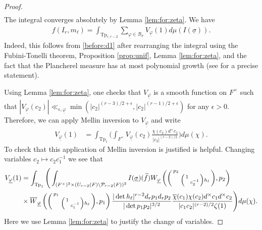 \documentclass[12pt]{amsart}
\theoremstyle{remark}
\numberwithin{equation}{section}
\theoremstyle{definition}
\newenvironment{psmatrix}
  {\left(\begin{smallmatrix}}
  {\end{smallmatrix}\right)}
\numberwithin{equation}{subsection}
\begin{document}
\begin{proof}
\begin{align*}
\end{align*}
The integral converges absolutely by Lemma \ref{lem:for:zeta}.
We have
\begin{align} \label{inV}
f(I_r,m_\ell)=\int_{\mathrm{Tp}_{r,r-2}} \sum_{\underline{\varphi}\in \mathcal{B}_{\underline{\sigma}}} V_{\underline{\varphi}}(1) d\mu(I(\underline{\sigma})).
\end{align}
Indeed, this follows from \eqref{before:d1} after rearranging the integral using the Fubini-Tonelli theorem, 
 Proposition \ref{prop:unif}, Lemma \ref{lem:for:zeta}, 
and the fact that the Plancherel measure has at most polynomial growth (see \cite[(2.13.2)]{BP:GLn} for a precise statement).

 Using Lemma \ref{lem:for:zeta}, one checks that $V_{\underline{\varphi}}$ is a smooth function on $F^\times$ such that  $|V_{\underline{\varphi}}(c_2)|\ll_{\epsilon,\underline{\varphi}} \min(|c_2|^{(r-3)/2+\epsilon},|c_2|^{(r-1)/2+\epsilon})$ for any $\epsilon>0$. Therefore, we can apply Mellin inversion to $V_{\underline{\varphi}}$ and write
\begin{align*}
    V_{\underline{\varphi}}(1)&=\int_{\mathrm{Tp}_1}\Big(\int_{F^\times} V_{\underline{\varphi}}(c_2)\frac{\chi(c_2)d^\times c_2}{|c_2|^{(r-2)/2}}\Big)d\mu(\chi).
\end{align*}
To check that this application of Mellin inversion is justified  \cite[(2.2)]{Blomer_Brumley_Ramanujan_Annals} is helpful.  
Changing variables $c_2 \mapsto c_2c_1^{-1}$ we see that 
\begin{align*}
V_{\underline{\varphi}}(1)&=
\int_{\mathrm{Tp}_1}\Bigg(\int_{(F^\times)^2 \times (U_{r-2}(F) \backslash \mathcal{P}_{r-2}(F))^2}I(\underline{\sigma})(\widetilde{f})W_{\underline{\varphi}}\left(\begin{psmatrix} p_2 & \\ & \begin{psmatrix} 1 & \\ & c_2^{-1}\end{psmatrix}h_\ell\end{psmatrix},p_2\right)\\& \times 
\overline{W}_{\underline{\varphi}}\left(\begin{psmatrix} p_1 & \\ & \begin{psmatrix} 1 & \\ & c_1^{-1}\end{psmatrix}h_\ell\end{psmatrix},p_1\right)
\frac{|\det h_\ell|^{r-2}d_r p_1d_r p_2}{|\det p_1p_2|^{3/2}}\frac{\overline{\chi}(c_1)\chi(c_2)d^\times c_1d^\times c_2}{|c_1c_2|^{(r-2)/2}\zeta(1)}\Bigg)d\mu(\chi).
\end{align*}
Here we use Lemma \ref{lem:for:zeta} to justify the change of variables.



\end{proof}
\end{document}
